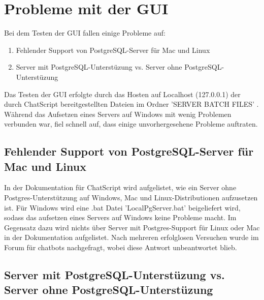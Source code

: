 \section{Probleme mit der GUI}
\label{sec: Probleme mit der GUI}

Bei dem Testen der GUI fallen einige Probleme auf: 

\begin{enumerate}
\item{Fehlender Support von PostgreSQL-Server für Mac und Linux}
\item{Server mit PostgreSQL-Unterstüzung vs. Server ohne PostgreSQL-Unterstüzung}
\end{enumerate}

Das Testen der GUI erfolgte durch das Hosten auf Localhost (127.0.0.1) der durch ChatScript bereitgestellten Dateien im Ordner 'SERVER BATCH FILES' \citep{chatscript2019}. Während das Aufsetzen eines Servers auf Windows mit wenig Problemen verbunden war, fiel schnell auf, dass einige unvorhergesehene Probleme auftraten. 

\subsection{Fehlender Support von PostgreSQL-Server für Mac und Linux}
\label{sec:Fehlender Support von PostgreSQL-Server für Mac und Linux}

In der Dokumentation für ChatScript wird aufgelistet, wie ein Server ohne Postgres-Unterstützung auf Windows, Mac und Linux-Distributionen aufzusetzen ist. Für Windows wird eine .bat Datei 'LocalPgServer.bat' beigeliefert wird, sodass das aufsetzen eines Servers auf Windows keine Probleme macht. Im Gegensatz dazu wird nichts über Server mit Postgres-Support für Linux oder Mac in der Dokumentation aufgelistet. Nach mehreren erfolglosen Versuchen wurde im Forum für chatbots nachgefragt, wobei diese Antwort unbeantwortet blieb. 

\subsection{Server mit PostgreSQL-Unterstüzung vs. Server ohne PostgreSQL-Unterstüzung}
\label{sec: Server mit PostgreSQL-Unterstüzung vs. Server ohne PostgreSQL-Unterstüzung}

